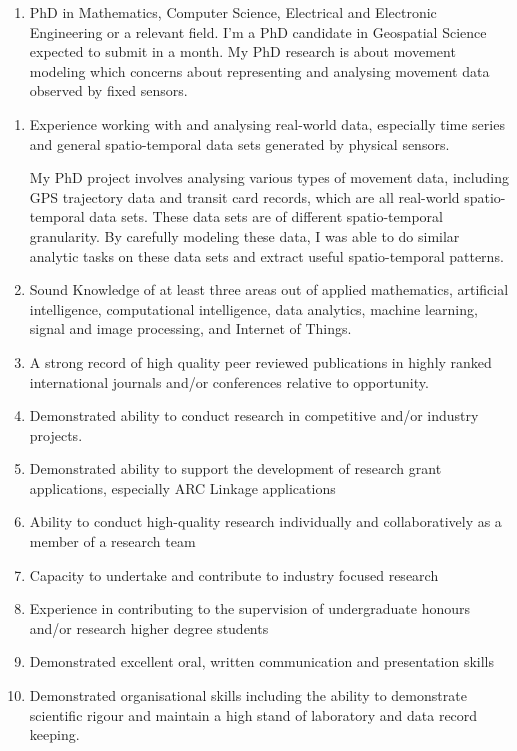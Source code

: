 \documentclass[11pt, a4paper]{awesome-cv} %
\begin{document}
\makecvheader %

\begin{enumerate}
\item PhD in Mathematics, Computer Science, Electrical and Electronic Engineering or a relevant field.
I'm a PhD candidate in Geospatial Science expected to submit in a month. My PhD research is about movement modeling which concerns about representing and analysing movement data observed by fixed sensors.

\end{enumerate}

\begin{enumerate}
    \item Experience working with and analysing real-world data, especially time series and general spatio-temporal data sets generated by physical sensors.
    
    My PhD project involves analysing various types of movement data, including GPS trajectory data and transit card records, which are all real-world spatio-temporal data sets. These data sets are of different spatio-temporal granularity. By carefully modeling these data, I was able to do similar analytic tasks on these data sets and extract useful spatio-temporal patterns.  
    
    \item Sound Knowledge of at least three areas out of applied mathematics, artificial intelligence, computational intelligence, data analytics, machine learning, signal and image processing, and Internet of Things.
    
    
    
    \item A strong record of high quality peer reviewed publications in highly ranked international journals and/or conferences relative to opportunity.
    \item Demonstrated ability to conduct research in competitive and/or industry projects.
    \item Demonstrated ability to support the development of research grant applications, especially ARC Linkage applications
    \item Ability to conduct high-quality research individually and collaboratively as a member of a research team
    \item Capacity to undertake and contribute to industry focused research
    \item Experience in contributing to the supervision of undergraduate honours and/or research higher degree students
    \item Demonstrated excellent oral, written communication and presentation skills
    \item Demonstrated organisational skills including the ability to demonstrate scientific rigour and maintain a high stand of laboratory and data record keeping.
\end{enumerate}
\end{document}
